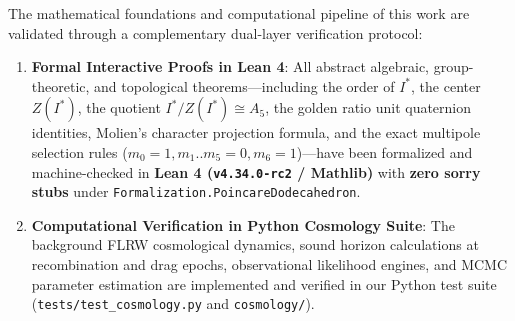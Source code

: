 \documentclass[11pt,a4paper]{article}
\theoremstyle{definition}
\begin{document}
The mathematical foundations and computational pipeline of this work are validated through a complementary dual-layer verification protocol:
\begin{enumerate}
    \item \textbf{Formal Interactive Proofs in Lean 4}: All abstract algebraic, group-theoretic, and topological theorems—including the order of $I^*$, the center $Z(I^*)$, the quotient $I^*/Z(I^*) \cong A_5$, the golden ratio unit quaternion identities, Molien's character projection formula, and the exact multipole selection rules ($m_0=1, m_1..m_5=0, m_6=1$)—have been formalized and machine-checked in \textbf{Lean 4 (\texttt{v4.34.0-rc2} / Mathlib)} with \textbf{zero sorry stubs} under \texttt{Formalization.PoincareDodecahedron}.
    \item \textbf{Computational Verification in Python Cosmology Suite}: The background FLRW cosmological dynamics, sound horizon calculations at recombination and drag epochs, observational likelihood engines, and MCMC parameter estimation are implemented and verified in our Python test suite (\texttt{tests/test_cosmology.py} and \texttt{cosmology/}).
\end{enumerate}
\end{document}
